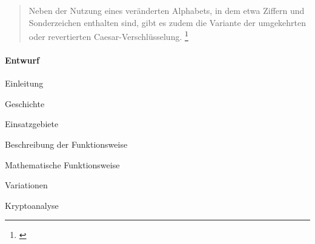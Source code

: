 \documentclass[11pt,paper=a4,final]{scrartcl}
\begin{document}
\begin{quote}
  \frqq Neben der Nutzung eines veränderten Alphabets, in dem etwa Ziffern und
  Sonderzeichen enthalten sind, gibt es zudem die Variante der umgekehrten oder
  revertierten Caesar-Verschlüsselung.\flqq
  \footnote{\cite{wiki:RSA-Kryptosystem}}
\end{quote}

\paragraph{Entwurf}
\begin{enumerate*}
  \item Einleitung
  \item Geschichte
  \item Einsatzgebiete
  \item Beschreibung der Funktionsweise
  \item Mathematische Funktionsweise
  \item Variationen
  \item Kryptoanalyse
\end{enumerate*}
\end{document}
